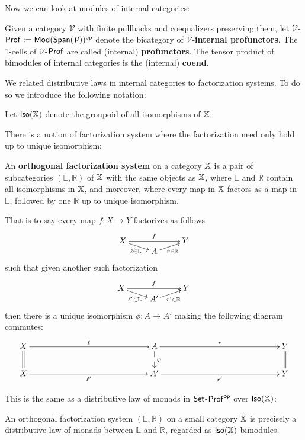 Now we can look at modules of internal categories:
\begin{definition}
\label{def:internalprof}
Given a category $\mathcal V$ with finite pullbacks and coequalizers preserving them, let $\mathcal V$-${\sf Prof}:={\sf Mod}(\mathsf{Span}(\mathcal V))^{\mathsf{op}}$ denote the bicategory of $\mathcal V$-{\bf internal profunctors}.  
The 1-cells of $\mathcal V$-${\sf Prof}$ are called (internal) {\bf  profunctors}.
The tensor product of bimodules of internal categories is the (internal) {\bf coend}.
\end{definition}
We related distributive laws in internal categories to factorization systems.  To do so we introduce the following notation:
\begin{definition}
Let ${\sf Iso}(\mathbb{X})$ denote the groupoid  of all isomorphisms of $\mathbb{X}$.
\end{definition}
There is a notion of factorization system where the factorization need only hold up to unique isomorphism:
\begin{definition}
An {\bf orthogonal factorization system} on a category $\mathbb{X}$ is a pair of subcategories $(\mathbb{L},\mathbb{R})$ of $\mathbb{X}$ with the same objects as $\mathbb{X}$, where $\mathbb{L}$ and $\mathbb{R}$ contain all isomorphisms in $\mathbb{X}$, and moreover, where every map in $\mathbb{X}$ factors as a map in  $\mathbb{L}$, followed by one $\mathbb{R}$ up to unique isomorphism.


That is to say every map $f:X\to Y$ factorizes as follows
$$\xymatrixrowsep{0mm}
\xymatrix{
X  \ar[rr]^{f} \ar[dr]_{\ell \in {\mathbb L}} &       & Y\\
   & A \ar[ur]_{r \in {\mathbb R}}
}
$$
such that given another such factorization
$$\xymatrixrowsep{0mm}
\xymatrix{
X  \ar[rr]^{f} \ar[dr]_{\ell' \in {\mathbb L}} &       & Y\\
   & A' \ar[ur]_{r' \in {\mathbb R}}
}
$$
then there is a unique isomorphism $\phi:A\to A'$ making the following diagram commutes:
$$
\xymatrixrowsep{7mm}
\xymatrixcolsep{50mm}
\xymatrix{
X \ar@{=}[d] \ar[r]^{\ell}   & A  \ar@{-->}[d]^{\phi} \ar[r]^{r} & Y \ar@{=}[d]\\
X   \ar[r]_{\ell'}                & A' \ar[r]_{r'} & Y
}
$$
\end{definition}
This is the same as a distributive law of monads in $\mathsf{Set}$-${\sf Prof}^{\mathsf{op}}$ over ${\sf Iso}(\mathbb{X})$:
\begin{lemma}
An orthogonal factorization system $(\mathbb{L},\mathbb{R})$ on a small category $\mathbb{X}$ is precisely a distributive law of monads between $\mathbb{L}$ and $\mathbb{R}$, regarded as ${\sf Iso}(\mathbb{X})$-bimodules.
\end{lemma}

